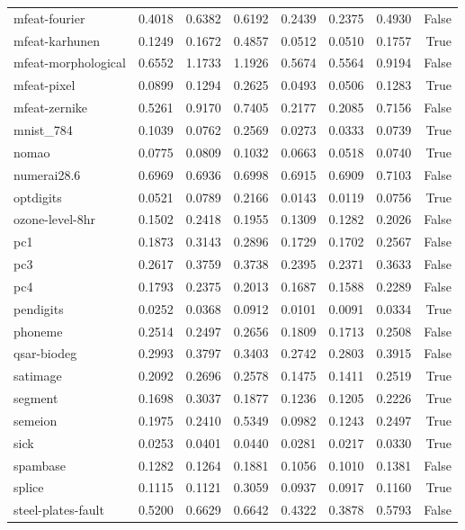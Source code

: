 \begin{table}[htbp]
\begin{tabular}{lrrrrrrr}
mfeat-fourier & 0.4018 & 0.6382 & 0.6192 & 0.2439 & 0.2375 & 0.4930 & False \\
mfeat-karhunen & 0.1249 & 0.1672 & 0.4857 & 0.0512 & 0.0510 & 0.1757 & True \\
mfeat-morphological & 0.6552 & 1.1733 & 1.1926 & 0.5674 & 0.5564 & 0.9194 & False \\
mfeat-pixel & 0.0899 & 0.1294 & 0.2625 & 0.0493 & 0.0506 & 0.1283 & True \\
mfeat-zernike & 0.5261 & 0.9170 & 0.7405 & 0.2177 & 0.2085 & 0.7156 & False \\
mnist\_784 & 0.1039 & 0.0762 & 0.2569 & 0.0273 & 0.0333 & 0.0739 & True \\
nomao & 0.0775 & 0.0809 & 0.1032 & 0.0663 & 0.0518 & 0.0740 & True \\
numerai28.6 & 0.6969 & 0.6936 & 0.6998 & 0.6915 & 0.6909 & 0.7103 & False \\
optdigits & 0.0521 & 0.0789 & 0.2166 & 0.0143 & 0.0119 & 0.0756 & True \\
ozone-level-8hr & 0.1502 & 0.2418 & 0.1955 & 0.1309 & 0.1282 & 0.2026 & False \\
pc1 & 0.1873 & 0.3143 & 0.2896 & 0.1729 & 0.1702 & 0.2567 & False \\
pc3 & 0.2617 & 0.3759 & 0.3738 & 0.2395 & 0.2371 & 0.3633 & False \\
pc4 & 0.1793 & 0.2375 & 0.2013 & 0.1687 & 0.1588 & 0.2289 & False \\
pendigits & 0.0252 & 0.0368 & 0.0912 & 0.0101 & 0.0091 & 0.0334 & True \\
phoneme & 0.2514 & 0.2497 & 0.2656 & 0.1809 & 0.1713 & 0.2508 & False \\
qsar-biodeg & 0.2993 & 0.3797 & 0.3403 & 0.2742 & 0.2803 & 0.3915 & False \\
satimage & 0.2092 & 0.2696 & 0.2578 & 0.1475 & 0.1411 & 0.2519 & True \\
segment & 0.1698 & 0.3037 & 0.1877 & 0.1236 & 0.1205 & 0.2226 & True \\
semeion & 0.1975 & 0.2410 & 0.5349 & 0.0982 & 0.1243 & 0.2497 & True \\
sick & 0.0253 & 0.0401 & 0.0440 & 0.0281 & 0.0217 & 0.0330 & True \\
spambase & 0.1282 & 0.1264 & 0.1881 & 0.1056 & 0.1010 & 0.1381 & False \\
splice & 0.1115 & 0.1121 & 0.3059 & 0.0937 & 0.0917 & 0.1160 & True \\
steel-plates-fault & 0.5200 & 0.6629 & 0.6642 & 0.4322 & 0.3878 & 0.5793 & False \\

\end{tabular}
\end{table}
